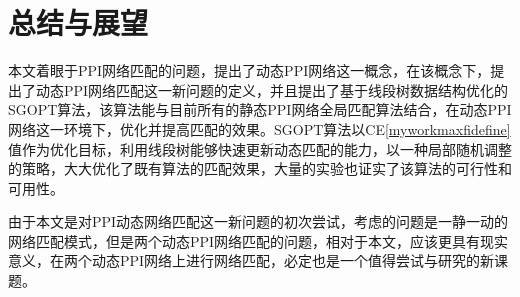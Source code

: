 \chapter{总结与展望}

本文着眼于PPI网络匹配的问题，提出了动态PPI网络这一概念，在该概念下，提出了动态PPI网络匹配这一新问题的定义，并且提出了基于线段树数据结构优化的SGOPT算法，该算法能与目前所有的静态PPI网络全局匹配算法结合，在动态PPI网络这一环境下，优化并提高匹配的效果。SGOPT算法以CE\ref{myworkmaxfidefine}值作为优化目标，利用线段树能够快速更新动态匹配的能力，以一种局部随机调整的策略，大大优化了既有算法的匹配效果，大量的实验也证实了该算法的可行性和可用性。

由于本文是对PPI动态网络匹配这一新问题的初次尝试，考虑的问题是一静一动的网络匹配模式，但是两个动态PPI网络匹配的问题，相对于本文，应该更具有现实意义，在两个动态PPI网络上进行网络匹配，必定也是一个值得尝试与研究的新课题。
